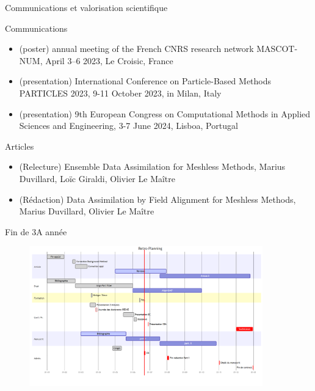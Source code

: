 \documentclass[aspectratio=169]{beamer} %
\begin{document}
\begin{frame}{Communications et valorisation scientifique}
    \begin{block}{Communications}
        \begin{itemize}
            \item (poster) annual meeting of the French CNRS research network MASCOT-NUM, April 3–6 2023, Le Croisic, France
            \item (presentation) International Conference on Particle-Based Methods PARTICLES 2023, 9-11 October 2023, in Milan, Italy
            \item (presentation) 9th European Congress on Computational Methods in Applied Sciences and Engineering, 3-7 June 2024, Lisboa, Portugal
        \end{itemize}
    \end{block}

    \begin{block}{Articles}
        \begin{itemize}
            \item (Relecture) Ensemble Data Assimilation for Meshless Methods, Marius Duvillard, Loïc Giraldi, Olivier Le Maître
            \item (Rédaction) Data Assimilation by Field Alignment for Meshless Methods, Marius Duvillard, Olivier Le Maître
        \end{itemize}
    \end{block}

\end{frame}

\begin{frame}{Fin de 3A année}
    \begin{figure}
        \includegraphics[width=0.9\textwidth]{image/retro_planning.png}
    \end{figure}
\end{frame}
\end{document}
